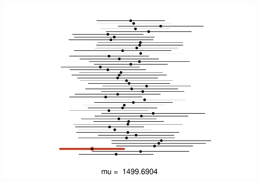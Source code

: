 \documentclass[]{article}
\begin{document}
\includegraphics{DATA_606_Lab_4b_files/figure-latex/unnamed-chunk-2-1.pdf}
\end{document}
